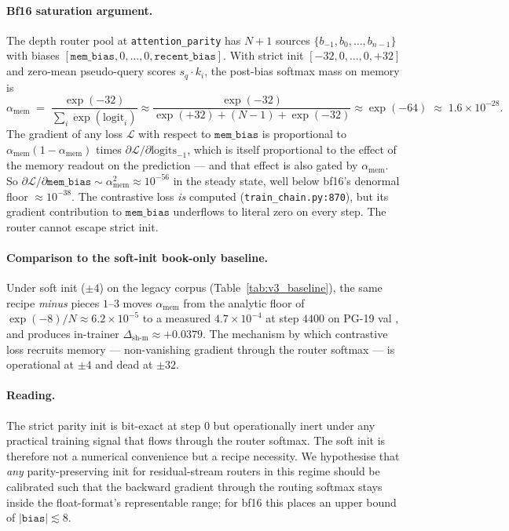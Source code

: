 \documentclass{article}
\newcommand{\dsh}{\Delta_{\text{sh-m}}}
\newcommand{\amem}{\alpha_{\text{mem}}}
\begin{document}
\paragraph{Bf16 saturation argument.} The depth router pool at
\texttt{attention\_parity} has $N\!+\!1$ sources $\{b_{-1}, b_0,
\dots, b_{n-1}\}$ with biases $[\texttt{mem\_bias}, 0, \dots, 0,
\texttt{recent\_bias}]$. With strict init $[-32, 0, \dots, 0, +32]$
and zero-mean pseudo-query scores $s_q \cdot k_i$, the post-bias
softmax mass on memory is
\[
\amem \;=\; \frac{\exp(-32)}{\sum_i \exp(\text{logit}_i)} \approx
\frac{\exp(-32)}{\exp(+32) + (N{-}1) + \exp(-32)} \approx \exp(-64)
\;\approx\; 1.6\!\times\!10^{-28}.
\]
The gradient of any loss $\mathcal{L}$ with respect to
$\texttt{mem\_bias}$ is proportional to $\amem(1-\amem)$ times
$\partial \mathcal{L}/\partial \mathrm{logits}_{-1}$, which is
itself proportional to the effect of the memory readout on the
prediction --- and that effect is also gated by $\amem$. So
$\partial \mathcal{L}/\partial \texttt{mem\_bias} \sim
\amem^2 \approx 10^{-56}$ in the steady state, well below bf16's
denormal floor $\approx 10^{-38}$. The contrastive loss \emph{is}
computed (\texttt{train\_chain.py:870}), but its gradient
contribution to $\texttt{mem\_bias}$ underflows to literal zero on
every step. The router cannot escape strict init.

\paragraph{Comparison to the soft-init book-only baseline.} Under
soft init ($\pm 4$) on the legacy corpus
(Table~\ref{tab:v3_baseline}), the same recipe \emph{minus} pieces
$1$--$3$ moves $\amem$ from the analytic floor of
$\exp(-8)/N \approx 6.2\!\times\!10^{-5}$ to a measured
$4.7\!\times\!10^{-4}$ at step $4400$ on PG-19 val
\cite{liu2025drop}, and produces in-trainer
$\dsh \approx +0.0379$. The mechanism by which contrastive loss
recruits memory --- non-vanishing gradient through the router
softmax --- is operational at $\pm 4$ and dead at $\pm 32$.

\paragraph{Reading.} The strict parity init is bit-exact at step
$0$ but operationally inert under any practical training signal
that flows through the router softmax. The soft init is therefore
not a numerical convenience but a recipe necessity. We hypothesise
that \emph{any} parity-preserving init for residual-stream routers
in this regime should be calibrated such that the backward gradient
through the routing softmax stays inside the float-format's
representable range; for bf16 this places an upper bound of
$|\!\texttt{bias}| \lesssim 8$.
\end{document}
